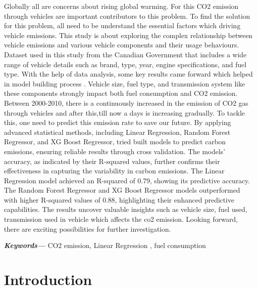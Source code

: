 \documentclass[12pt, a4paper,oneside]{book}
\numberwithin{equation}{section}
\providecommand{\keywords}[1]
{
  \small	
  \textbf{\textit{Keywords---}} #1
}
\begin{document}
Globally all are  concerns about rising global warming. For this CO2 emission through vehicles are important contributors to this problem. To find the solution for this problem, all need to be understand the essential factors which driving vehicle emissions.
This study is about exploring the complex relationship between vehicle emissions and various vehicle components and their usage behaviours. Dataset used in this study from the Canadian Government that includes a wide range of vehicle details such as brand, type, year, engine specifications, and fuel type. With the help of data analysis, some key results came forward which helped in model building process . Vehicle size, fuel type, and transmission system like these components strongly impact both fuel consumption and CO2 emission. Between 2000-2010, there is a continuously increased in the emission of CO2 gas through vehicles and after this,till now a days is increasing gradually. To tackle this, one need to predict this emission rate to save our future. By applying advanced statistical methods, including Linear Regression, Random Forest Regressor, and XG Boost Regressor, tried built models to predict carbon emissions, ensuring reliable results through cross validation. The models' accuracy, as indicated by their R-squared values, further confirms their effectiveness in capturing the variability in carbon emissions. The Linear Regression model achieved an R-squared of 0.79, showing its predictive accuracy. The Random Forest Regressor and XG Boost Regressor models outperformed with higher R-squared values of 0.88, highlighting their enhanced predictive capabilities. The results uncover valuable insights such as vehicle size, fuel used, transmission used in vehicle which affects the co2 emission.  Looking forward, there are exciting possibilities for further investigation. 



\newline

\keywords{CO2 emission, Linear Regression , fuel consumption}
\newpage
\tableofcontents

\listoffigures
\listoftables

\bigskip

\bigskip


\chapter{Introduction}\label{ch:1}
\end{document}
